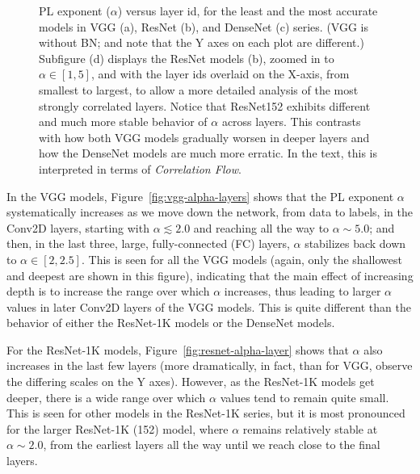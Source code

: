 \begin{figure}[t]
{        %
        \label{fig:resnet_alpha_overlaid_depth}
    }
    \caption{PL exponent ($\alpha$) versus layer id, for the least and the most accurate models in VGG (a), ResNet (b), and DenseNet (c) series. 
             (VGG is without BN; and note that the Y axes on each plot are different.)  
             Subfigure (d) displays the ResNet models (b), zoomed in to $\alpha\in[1,5]$, and with the layer ids overlaid on the X-axis, from smallest to largest, to
             allow a more detailed analysis of the most strongly correlated layers.
             Notice that ResNet152 exhibits different and much more stable behavior of $\alpha$ across layers.
             This contrasts with how both VGG models gradually worsen in deeper layers and how the DenseNet models are much more erratic.  
             In the text, this is interpreted in terms of \emph{Correlation Flow}.
            }
    \label{fig:3models-alpha-layers}
\end{figure}

In the VGG models, Figure~\ref{fig:vgg-alpha-layers} shows that the PL exponent $\alpha$ systematically increases as we move down the network, from data to labels, in the Conv2D layers, starting with $\alpha\lesssim 2.0$ and reaching all the way to $\alpha\sim 5.0$; and then, in the last three, large, fully-connected (FC) layers, $\alpha$ stabilizes back down to $\alpha\in[2,2.5]$.
This is seen for all the VGG models (again, only the shallowest and deepest are shown in this figure), indicating that the main effect of increasing depth is to increase the range over which $\alpha$ increases, thus leading to larger $\alpha$ values in later Conv2D layers of the VGG models.
This is quite different than the behavior of either the ResNet-1K models or the DenseNet models.

For the ResNet-1K models, Figure~\ref{fig:resnet-alpha-layer} shows that $\alpha$ also increases in the last few layers (more dramatically, in fact, than for VGG, observe the differing scales on the Y axes).
However, as the ResNet-1K models get deeper, there is a wide range over which $\alpha$ values tend to remain quite small.
This is seen for other models in the ResNet-1K series, but it is most pronounced for the larger ResNet-1K (152) model, where $\alpha$ remains relatively stable at $\alpha\sim 2.0$, from the earliest layers all the way until we reach close to the final layers.  


